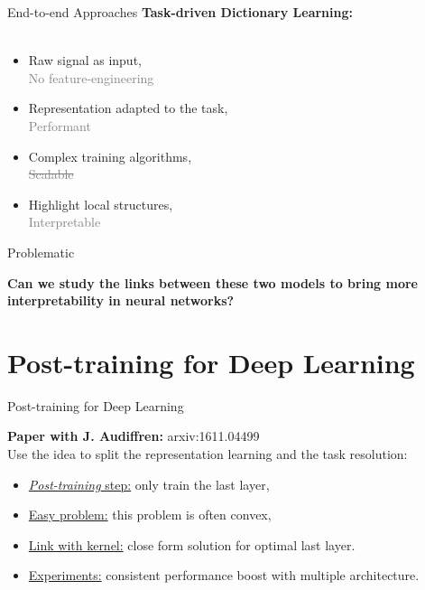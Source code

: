 \documentclass[ignorenonframetext]{beamer}
\def\keypoint#1{\hfill\textcolor{gray}{#1}}
\def\mycite#1{\keypoint{\cite{#1}}}
\begin{document}
\begin{frame}{End-to-end Approaches}
\Large
{\bf Task-driven Dictionary Learning:}\\\mycite{Mairal2012}\\[.3em]
	\begin{itemize}\itemindent2em\itemsep.25em
		\item Raw signal as input, \\[.25em]
		\keypoint{No feature-engineering}
		\item Representation adapted to the task,\\[.25em]
		\keypoint{Performant}
		\item Complex training algorithms, \\[.25em]
		\keypoint{\sout{Scalable}}
		\item Highlight local structures,\\[.25em]
		\keypoint{Interpretable}
	\end{itemize}

\end{frame}


\begin{frame}{Problematic}

	\centering \huge
	{\bf Can we study the links between these two models to bring more interpretability in neural networks?}

\end{frame}

\section{Post-training for Deep Learning}
\label{sec:post_train}


\begin{frame}{Post-training for Deep Learning}

	{\bf Paper with J. Audiffren: } arxiv:1611.04499\\[2em]

	Use the idea to split the representation learning and the task resolution:\\[1em]
	\begin{itemize}\itemindent1em\itemsep1.5em
		\item \underline{{\it Post-training} step:} only train the last layer,
		\item \underline{Easy problem:} this problem is often convex,
		\item \underline{Link with kernel:} close form solution for optimal last layer.
		\item \underline{Experiments:} consistent performance boost with multiple architecture.
	\end{itemize}
	
\end{frame}
\end{document}
